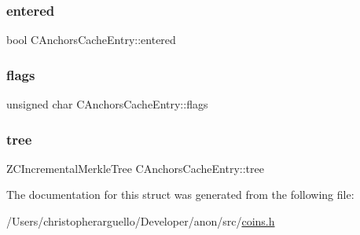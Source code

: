 \subsubsection{\texorpdfstring{entered}{entered}}
{\footnotesize\ttfamily bool C\+Anchors\+Cache\+Entry\+::entered}

\mbox{\label{struct_c_anchors_cache_entry_a9d421b72885a038bb1586b5fb07fd660}} 
\subsubsection{\texorpdfstring{flags}{flags}}
{\footnotesize\ttfamily unsigned char C\+Anchors\+Cache\+Entry\+::flags}

\mbox{\label{struct_c_anchors_cache_entry_a226001cb91886f33a603d449b39f28a0}} 
\subsubsection{\texorpdfstring{tree}{tree}}
{\footnotesize\ttfamily Z\+C\+Incremental\+Merkle\+Tree C\+Anchors\+Cache\+Entry\+::tree}



The documentation for this struct was generated from the following file\+:\begin{DoxyCompactItemize}
\item 
/\+Users/christopherarguello/\+Developer/anon/src/\mbox{\hyperlink{coins_8h}{coins.\+h}}\end{DoxyCompactItemize}
